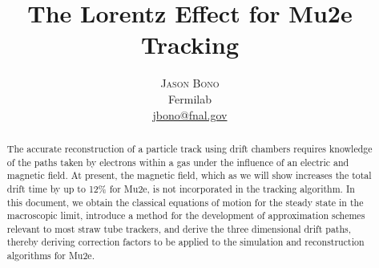 \documentclass[twoside]{article}
\title{\vspace{-15mm}\fontsize{24pt}{10pt}\selectfont\textbf{The Lorentz Effect for Mu2e Tracking}} %
\author{
\large
\textsc{Jason Bono}\\[2mm] %
\normalsize Fermilab \\ %
\normalsize \href{mailto:jbono@fnal.gov}{jbono@fnal.gov} %
\vspace{-5mm}
}
\date{}
\begin{document}
\maketitle %

\thispagestyle{fancy} %


\begin{abstract}

\noindent The accurate reconstruction of a particle track using drift chambers requires knowledge of the paths taken by electrons within a gas under the influence of an electric and magnetic field. At present, the magnetic field, which as we will show increases the total drift time by up to 12\% for Mu2e, is not incorporated in the tracking algorithm. In this document, we obtain the classical equations of motion for the steady state in the macroscopic limit, introduce a method for the development of approximation schemes relevant to most straw tube trackers, and derive the three dimensional drift paths, thereby deriving correction factors to be applied to the simulation and reconstruction algorithms for Mu2e. 

\end{abstract}

\end{document}

